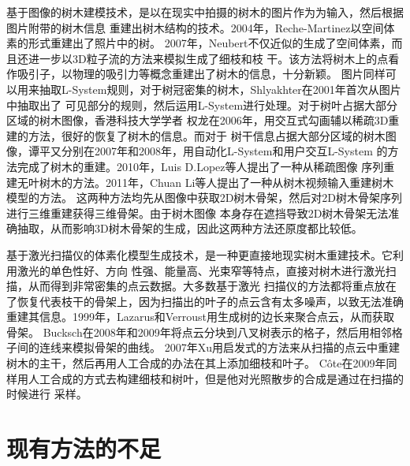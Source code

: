 基于图像的树木建模技术，是以在现实中拍摄的树木的图片作为为输入，然后根据图片附带的树木信息
重建出树木结构的技术。2004年，Reche-Martinez以空间体素的形式重建出了照片中的树\cite{reche}。
2007年，Neubert不仅近似的生成了空间体素，而且还进一步以3D粒子流的方法来模拟生成了细枝和枝
干\cite{neubert}。该方法将树木上的点看作吸引子，以物理的吸引力等概念重建出了树木的信息，十分新颖。
图片同样可以用来抽取L-System规则，对于树冠密集的树木，Shlyakhter在2001年首次从图片中抽取出了
可见部分的规则，然后运用L-System进行处理。对于树叶占据大部分区域的树木图像，香港科技大学学者
权龙在2006年，用交互式勾画辅以稀疏3D重建的方法，很好的恢复了树木的信息\cite{quanlong}。而对于
树干信息占据大部分区域的树木图像，谭平又分别在2007年和2008年，用自动化L-System和用户交互L-System
的方法完成了树木的重建\cite{tanping,tanping2}。2010年，Luis D.Lopez等人提出了一种从稀疏图像
序列重建无叶树木的方法。2011年，Chuan Li等人提出了一种从树木视频输入重建树木模型的方法\cite{lichuan}。
这两种方法均先从图像中获取2D树木骨架，然后对2D树木骨架序列进行三维重建获得三维骨架。由于树木图像
本身存在遮挡导致2D树木骨架无法准确抽取，从而影响3D树木骨架的生成，因此这两种方法还原度都比较低。

基于激光扫描仪的体素化模型生成技术，是一种更直接地现实树木重建技术。它利用激光的单色性好、方向
性强、能量高、光束窄等特点，直接对树木进行激光扫描，从而得到非常密集的点云数据。大多数基于激光
扫描仪的方法都将重点放在了恢复代表枝干的骨架上，因为扫描出的叶子的点云含有太多噪声，以致无法准确
重建其信息。1999年，Lazarus和Verroust用生成树的边长来聚合点云，从而获取骨架\cite{verroust}。
Bucksch在2008年和2009年将点云分块到八叉树表示的格子，然后用相邻格子间的连线来模拟骨架的曲线\cite{bucksch}。
2007年Xu用启发式的方法来从扫描的点云中重建树木的主干，然后再用人工合成的办法在其上添加细枝和叶子\cite{xu}。
C\^ote在2009年同样用人工合成的方式去构建细枝和树叶，但是他对光照散步的合成是通过在扫描的时候进行
采样\cite{cote}。

\section{现有方法的不足}

